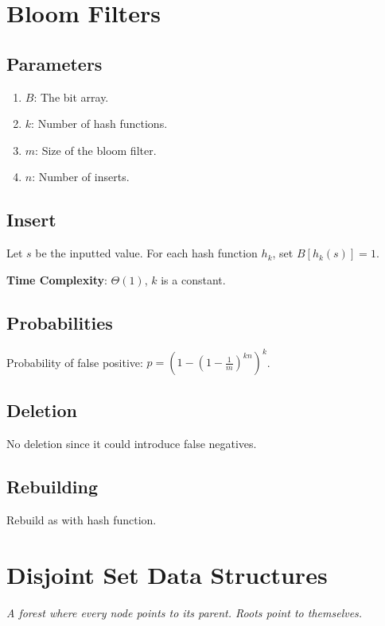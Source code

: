 \documentclass[12pt, letterpaper]{article}
\begin{document}
\begin{multicols*}{3}
        \section{Bloom Filters}

        \subsection{Parameters}
        \begin{enumerate}
            \item $B$: The bit array.
            \item $k$: Number of hash functions.
            \item $m$: Size of the bloom filter.
            \item $n$: Number of inserts.
        \end{enumerate}

        \subsection{Insert}
        Let $s$ be the inputted value. For each hash function $h_k$, set $B[h_k(s)] = 1$.

        {\bf Time Complexity}: $\Theta(1)$, $k$ is a constant.

        \subsection{Probabilities}

        Probability of false positive: $p = \left(1 - \left(1 - \frac{1}{m}\right)^{kn}\right)^k$.

        \subsection{Deletion}
        No deletion since it could introduce false negatives.

        \subsection{Rebuilding}

        Rebuild as with hash function.


        
        
        \section{Disjoint Set Data Structures}
            {\it A forest where every node points to its parent. Roots point to themselves.}


\end{multicols*}
\end{document}
